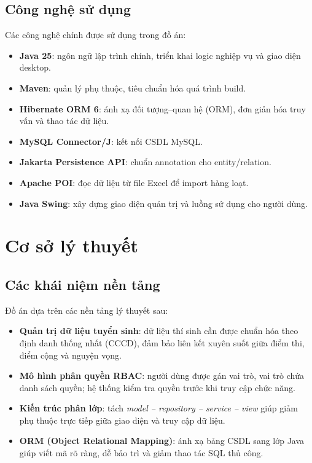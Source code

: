 \documentclass[12pt,a4paper,oneside]{report}
\begin{document}
\section{Công nghệ sử dụng}
Các công nghệ chính được sử dụng trong đồ án:
\begin{itemize}
  \item \textbf{Java 25}: ngôn ngữ lập trình chính, triển khai logic nghiệp vụ và giao diện desktop.
  \item \textbf{Maven}: quản lý phụ thuộc, tiêu chuẩn hóa quá trình build.
  \item \textbf{Hibernate ORM 6}: ánh xạ đối tượng--quan hệ (ORM), đơn giản hóa truy vấn và thao tác dữ liệu.
  \item \textbf{MySQL Connector/J}: kết nối CSDL MySQL.
  \item \textbf{Jakarta Persistence API}: chuẩn annotation cho entity/relation.
  \item \textbf{Apache POI}: đọc dữ liệu từ file Excel để import hàng loạt.
  \item \textbf{Java Swing}: xây dựng giao diện quản trị và luồng sử dụng cho người dùng.
\end{itemize}

\chapter{Cơ sở lý thuyết}
\section{Các khái niệm nền tảng}
Đồ án dựa trên các nền tảng lý thuyết sau:
\begin{itemize}
  \item \textbf{Quản trị dữ liệu tuyển sinh}: dữ liệu thí sinh cần được chuẩn hóa theo định danh thống nhất (CCCD), đảm bảo liên kết xuyên suốt giữa điểm thi, điểm cộng và nguyện vọng.
  \item \textbf{Mô hình phân quyền RBAC}: người dùng được gán vai trò, vai trò chứa danh sách quyền; hệ thống kiểm tra quyền trước khi truy cập chức năng.
  \item \textbf{Kiến trúc phân lớp}: tách \textit{model -- repository -- service -- view} giúp giảm phụ thuộc trực tiếp giữa giao diện và truy cập dữ liệu.
  \item \textbf{ORM (Object Relational Mapping)}: ánh xạ bảng CSDL sang lớp Java giúp viết mã rõ ràng, dễ bảo trì và giảm thao tác SQL thủ công.
\end{itemize}
\end{document}

